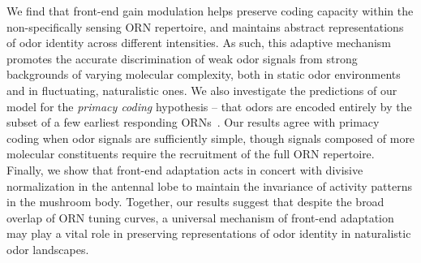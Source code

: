 We find that front-end gain modulation helps preserve coding capacity within the non-specifically sensing ORN repertoire, and maintains abstract representations of odor identity across different intensities. As such, this adaptive mechanism promotes the  accurate  discrimination of weak odor signals from strong backgrounds of varying molecular complexity, both in static odor environments  and in fluctuating, naturalistic ones. We also investigate the predictions of our model for the \textit{primacy coding} hypothesis  -- that odors are encoded entirely by the subset of a few earliest responding ORNs~\cite{primacy_coding, primacy_math}. Our results agree with primacy coding when odor signals are sufficiently  simple, though signals composed of more molecular constituents require the recruitment of the full ORN repertoire. Finally, we show that front-end adaptation acts in concert with divisive normalization in the antennal lobe to maintain the invariance of activity patterns  in the  mushroom body. Together, our results suggest that despite the broad overlap of ORN tuning curves, a universal mechanism of front-end adaptation may play a vital role in preserving representations of odor identity in naturalistic odor landscapes.



